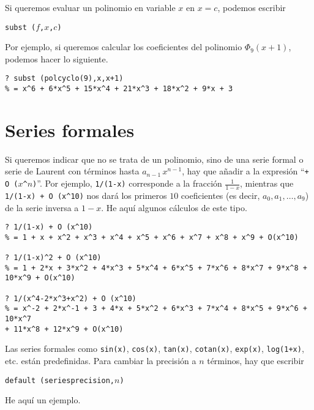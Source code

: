 Si queremos evaluar un polinomio en variable $x$ en $x=c$, podemos escribir
\begin{center}
\texttt{subst\,($f$,$x$,$c$)}
\end{center}
Por ejemplo, si queremos calcular los coeficientes del polinomio $\Phi_9 (x+1)$,
podemos hacer lo siguiente.

\begin{framed}\footnotesize
\begin{verbatim}
? subst (polcyclo(9),x,x+1)
% = x^6 + 6*x^5 + 15*x^4 + 21*x^3 + 18*x^2 + 9*x + 3
\end{verbatim}
\end{framed}


\section{Series formales}

Si queremos indicar que no se trata de un polinomio, sino de una serie formal o
serie de Laurent con términos hasta $a_{n-1}\,x^{n-1}$, hay que añadir a
la expresión ``\texttt{+ O ($x$\^{}$n$)}''. Por ejemplo, \texttt{1/(1-x)}
corresponde a la fracción $\frac{1}{1-x}$, mientras que
\texttt{1/(1-x) + O (x\^{}10)} nos dará los primeros $10$ coeficientes
(es decir, $a_0,a_1,\ldots,a_9$) de la serie inversa a $1-x$. He aquí algunos
cálculos de este tipo.

\begin{framed}\footnotesize
\begin{verbatim}
? 1/(1-x) + O (x^10)
% = 1 + x + x^2 + x^3 + x^4 + x^5 + x^6 + x^7 + x^8 + x^9 + O(x^10)

? 1/(1-x)^2 + O (x^10)
% = 1 + 2*x + 3*x^2 + 4*x^3 + 5*x^4 + 6*x^5 + 7*x^6 + 8*x^7 + 9*x^8 + 10*x^9 + O(x^10)

? 1/(x^4-2*x^3+x^2) + O (x^10)
% = x^-2 + 2*x^-1 + 3 + 4*x + 5*x^2 + 6*x^3 + 7*x^4 + 8*x^5 + 9*x^6 + 10*x^7
+ 11*x^8 + 12*x^9 + O(x^10)
\end{verbatim}
\end{framed}

Las series formales como \texttt{sin(x)}, \texttt{cos(x)}, \texttt{tan(x)},
\texttt{cotan(x)}, \texttt{exp(x)}, \texttt{log(1+x)}, etc. están
predefinidas. Para cambiar la precisión a $n$ términos, hay que escribir
\begin{center}
  \texttt{default\,(seriesprecision,$n$)}
\end{center}
He aquí un ejemplo.

